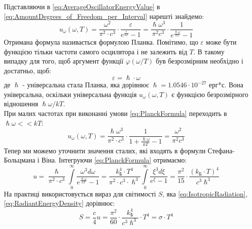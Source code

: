 \documentclass{article}
\begin{document}
Підставляючи в \eqref{eq:AverageOscillatorEnergyValue} в \eqref{eq:AmountDegrees_of_Freedom_per_Interval} нарешті знайдемо:
\begin{equation}
    \label{eq:PlanckFormula}
    u_{\omega}(\omega, T) = \frac{\omega^{2}}{\pi^{2} \cdot c^{3}} \cdot \frac{\varepsilon}{e^\tfrac{\varepsilon}{kT} - 1} = \frac{\hslash \omega^{3}}{\pi^{2} c^{3}} \cdot 
    \frac{1}{e^\tfrac{\hslash \omega}{kT} - 1}
\end{equation}                                       
Отримана формула називається формулою Планка. Помітимо, що $\varepsilon$ може бути функцією тільки частоти самого осцилятора і не залежить від $T$. В такому випадку для того, щоб аргумент функції $\varphi(\omega/T)$ був безрозмірним 
необхідно і достатньо, щоб:
\begin{equation}
    \label{eq:Value_of_epsilon}
    \varepsilon =\hslash \cdot \omega
\end{equation}
де $\hslash$ - універсальна стала Планка, яка дорівнює $\hslash = 1.0546 \cdot 10^{-27}$ ерг*с. Вона універсальна, оскільки універсальна функція $u_{\omega}(\omega, T)$ є функцією  безрозмірного відношення $\hslash \omega / kT$. \vspace{5mm} \\
При малих частотах при виконанні умови \eqref{eq:PlanckFormula} переходить в $\hslash \omega << kT$: 
\begin{equation*}
    \label{eq:Rayleigh-JeansFormula}
    u_{\omega}(\omega, T) = \frac{\hslash \omega^{3}}{\pi^{2} \cdot c^{3}} \cdot \frac{1}{1 + \frac{\hslash \omega}{kT} - 1} = \frac{\omega^{2}}{\pi^{2} c^{3}}
\end{equation*}
Тепер ми можемо уточнити значення сталих, які входять в формули Стефана-Больцмана і Віна. Інтегруючи \eqref{eq:PlanckFormula} отримаємо: 
\begin{equation}
    \label{eq:FINALValue_of_IntegralEnergyDensity}
    u = \frac{\hslash}{\pi^{2} \cdot c^{3}} \int\limits_{0}^{\infty} \frac{\omega^{3} d\omega}{e^{\tfrac{\hslash \omega}{kT}} - 1} = \frac{k_{\text{Б}}^{4} \cdot T^{4}}{\pi^{2} \cdot c^{3} \cdot \hslash^{3}} 
    \int\limits_{0}^{\infty} \frac{\xi^{3} d\xi}{e^{\xi} - 1} = \frac{\pi^{2}}{15} \cdot \frac{(k_{\text{Б}}\cdot T)^{4}}{c^{3} \hslash^{3}}
\end{equation}
На практиці використовується вираз для світимості $S$, яка \eqref{eq:IsotropicRadiation}, \eqref{eq:RadiantEnergyDensity} дорівнює: 
\begin{equation}
    \label{eq:LightingFormula}
    S = \frac{c}{4} u = \frac{\pi^{2}}{60} \cdot \frac{k_{\text{Б}}^{4}}{c^{3} \hslash^{3}} \cdot T^{4} = \sigma \cdot T^{4}
\end{equation}
\end{document}
